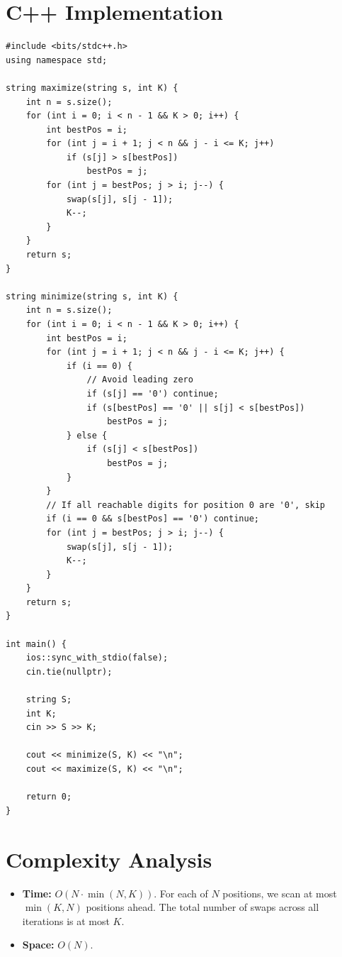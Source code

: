 \documentclass[11pt,a4paper]{article}
\begin{document}
\section{C++ Implementation}

\begin{lstlisting}
#include <bits/stdc++.h>
using namespace std;

string maximize(string s, int K) {
    int n = s.size();
    for (int i = 0; i < n - 1 && K > 0; i++) {
        int bestPos = i;
        for (int j = i + 1; j < n && j - i <= K; j++)
            if (s[j] > s[bestPos])
                bestPos = j;
        for (int j = bestPos; j > i; j--) {
            swap(s[j], s[j - 1]);
            K--;
        }
    }
    return s;
}

string minimize(string s, int K) {
    int n = s.size();
    for (int i = 0; i < n - 1 && K > 0; i++) {
        int bestPos = i;
        for (int j = i + 1; j < n && j - i <= K; j++) {
            if (i == 0) {
                // Avoid leading zero
                if (s[j] == '0') continue;
                if (s[bestPos] == '0' || s[j] < s[bestPos])
                    bestPos = j;
            } else {
                if (s[j] < s[bestPos])
                    bestPos = j;
            }
        }
        // If all reachable digits for position 0 are '0', skip
        if (i == 0 && s[bestPos] == '0') continue;
        for (int j = bestPos; j > i; j--) {
            swap(s[j], s[j - 1]);
            K--;
        }
    }
    return s;
}

int main() {
    ios::sync_with_stdio(false);
    cin.tie(nullptr);

    string S;
    int K;
    cin >> S >> K;

    cout << minimize(S, K) << "\n";
    cout << maximize(S, K) << "\n";

    return 0;
}
\end{lstlisting}

\section{Complexity Analysis}
\begin{itemize}
  \item \textbf{Time:} $O(N \cdot \min(N, K))$. For each of $N$
        positions, we scan at most $\min(K, N)$ positions ahead.
        The total number of swaps across all iterations is at most $K$.
  \item \textbf{Space:} $O(N)$.
\end{itemize}
\end{document}
